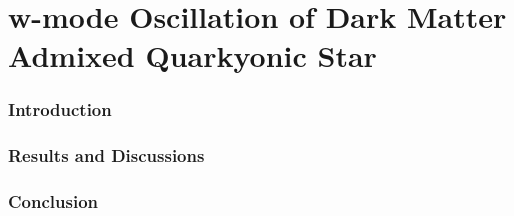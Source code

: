 \chapter{w-mode Oscillation of Dark Matter Admixed Quarkyonic Star}
\label{C5} 
\subsection{Introduction}
\subsection{Results and Discussions}
\subsection{Conclusion}